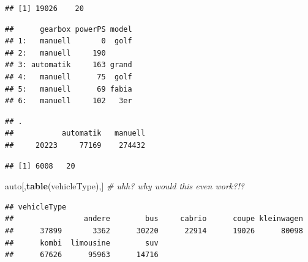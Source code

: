 \documentclass[]{book}
\newenvironment{Shaded}{\begin{snugshade}}{\end{snugshade}}
\newcommand{\CommentTok}[1]{\textcolor[rgb]{0.56,0.35,0.01}{\textit{#1}}}
\newcommand{\KeywordTok}[1]{\textcolor[rgb]{0.13,0.29,0.53}{\textbf{#1}}}
\newcommand{\NormalTok}[1]{#1}
\newcommand{\OperatorTok}[1]{\textcolor[rgb]{0.81,0.36,0.00}{\textbf{#1}}}
\newcommand{\StringTok}[1]{\textcolor[rgb]{0.31,0.60,0.02}{#1}}
\theoremstyle{definition}
\theoremstyle{definition}
\theoremstyle{definition}
\theoremstyle{remark}
\begin{document}
\begin{verbatim}
## [1] 19026    20
\end{verbatim}

\begin{Shaded}
\end{Shaded}

\begin{verbatim}
##      gearbox powerPS model
## 1:   manuell       0  golf
## 2:   manuell     190      
## 3: automatik     163 grand
## 4:   manuell      75  golf
## 5:   manuell      69 fabia
## 6:   manuell     102   3er
\end{verbatim}

\begin{Shaded}
\end{Shaded}

\begin{verbatim}
## .
##           automatik   manuell 
##     20223     77169    274432
\end{verbatim}

\begin{Shaded}
\end{Shaded}

\begin{verbatim}
## [1] 6008   20
\end{verbatim}

\begin{Shaded}
\begin{Highlighting}[]
\NormalTok{auto[,}\KeywordTok{table}\NormalTok{(vehicleType),] }\CommentTok{# uhh? why would this even work?!?}
\end{Highlighting}
\end{Shaded}

\begin{verbatim}
## vehicleType
##                andere        bus     cabrio      coupe kleinwagen 
##      37899       3362      30220      22914      19026      80098 
##      kombi  limousine        suv 
##      67626      95963      14716
\end{verbatim}
\end{document}
